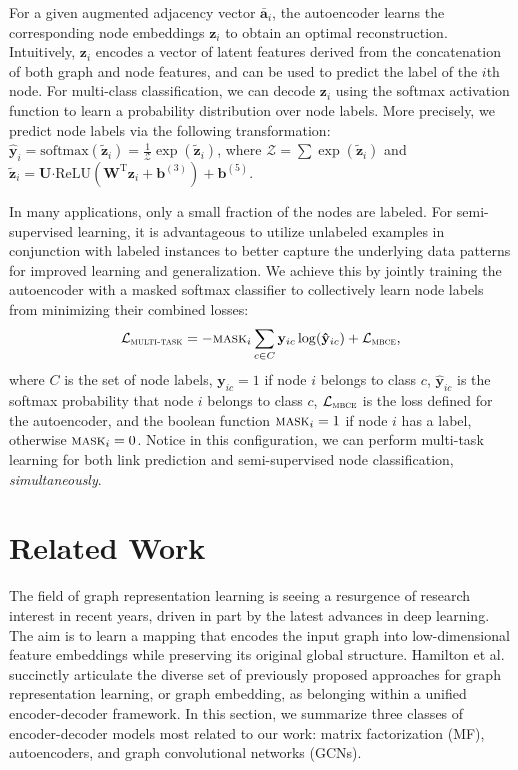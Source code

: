 \documentclass[letterpaper, conference]{IEEEtran}  %
\begin{document}
For a given augmented adjacency vector $\mathbf{\bar{a}}_i$, the autoencoder learns the corresponding node embeddings $\mathbf{z}_i$ to obtain an optimal reconstruction. Intuitively, $\mathbf{z}_i$ encodes a vector of latent features derived from the concatenation of both graph and node features, and can be used to predict the label of the $i$th node. For multi-class classification, we can decode $\mathbf{z}_i$ using the softmax activation function to learn a probability distribution over node labels. More precisely, we predict node labels via the following transformation: $\mathbf{\hat{y}}_i = \text{softmax}(\mathbf{\tilde{z}}_i) = \frac{1}{\mathcal{Z}} \exp(\mathbf{\tilde{z}}_i)$, where $\mathcal{Z} = \sum \exp(\mathbf{\tilde{z}}_i)$ and $\mathbf{\tilde{z}}_i = \mathbf{U} \boldsymbol{\cdot} \text{ReLU}\left(\mathbf{W}^\text{T} \mathbf{z}_i + \mathbf{b}^{(3)}\right) + \mathbf{b}^{(5)}$.

In many applications, only a small fraction of the nodes are labeled. For semi-supervised learning, it is advantageous to utilize unlabeled examples in conjunction with labeled instances to better capture the underlying data patterns for improved learning and generalization. We achieve this by jointly training the autoencoder with a masked softmax classifier to collectively learn node labels from minimizing their combined losses:
\begin{equation*}
\mathcal{L}_{\textsc{multi-task}} = - \textsc{mask}_i \sum_{c \in C}\mathbf{y}_{ic} \log (\mathbf{\hat{y}}_{ic}) + \mathcal{L}_{\textsc{mbce}},
\end{equation*}
where $C$ is the set of node labels, $\mathbf{y}_{ic} = 1$ if node $i$ belongs to class $c$, $\mathbf{\hat{y}}_{ic}$ is the softmax probability that node $i$ belongs to class $c$, $\mathcal{L}_{\textsc{mbce}}$ is the loss defined for the autoencoder, and the boolean function $\textsc{mask}_i = 1$ if node $i$ has a label, otherwise $\textsc{mask}_i = 0$. Notice in this configuration, we can perform multi-task learning for both link prediction and semi-supervised node classification, \emph{simultaneously}.

\section{Related Work}

The field of graph representation learning is seeing a resurgence of research interest in recent years, driven in part by the latest advances in deep learning. The aim is to learn a mapping that encodes the input graph into low-dimensional feature embeddings while preserving its original global structure. Hamilton et al. \cite{Hamilton:2017} succinctly articulate the diverse set of previously proposed approaches for graph representation learning, or graph embedding, as belonging within a unified encoder-decoder framework. In this section, we summarize three classes of encoder-decoder models most related to our work: matrix factorization (MF), autoencoders, and graph convolutional networks (GCNs).
\end{document}
